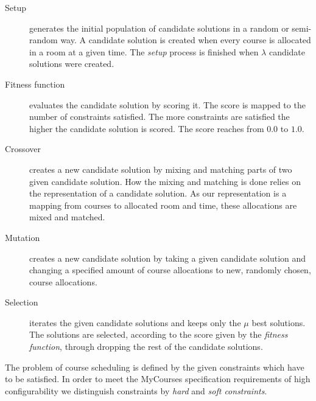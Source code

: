 \begin{description}
\item[Setup] generates the initial population of candidate solutions in a random or semi-random way. A candidate solution is created when every course is allocated in a room at a given time. The \emph{setup} process is finished when $\lambda$ candidate solutions were created.

\item[Fitness function] evaluates the candidate solution by scoring it. The score is mapped to the number of constraints satisfied. The more constraints are satisfied the higher the candidate solution is scored. The score reaches from $0.0$ to $1.0$.

\item[Crossover] creates a new candidate solution by mixing and matching parts of two given candidate solution. How the mixing and matching is done relies on the representation of a candidate solution. As our representation is a mapping from courses to allocated room and time, these allocations are mixed and matched.

\item[Mutation] creates a new candidate solution by taking a given candidate solution and changing a specified amount of course allocations to new, randomly chosen, course allocations.

\item[Selection] iterates the given candidate solutions and keeps only the $\mu$ best solutions. The solutions are selected, according to the score given by the \emph{fitness function}, through dropping the rest of the candidate solutions.
\end{description}

The problem of course scheduling is defined by the given constraints which have to be satisfied. In order to meet the MyCourses specification requirements of high configurability we distinguish constraints by \emph{hard} and \emph{soft constraints}.

